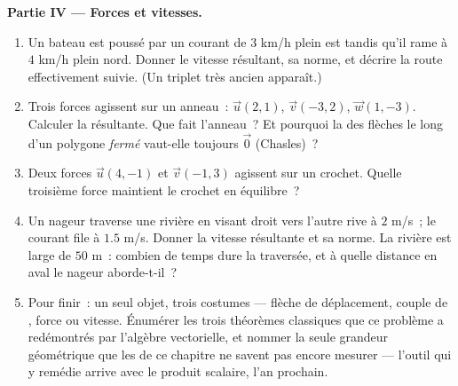 \begin{problem}
\medskip
\noindent\textbf{Partie IV --- Forces et vitesses.}
\begin{enumerate}[resume]
  \item Un bateau est poussé par un courant de $3$ km/h plein est
        tandis qu'il rame à $4$ km/h plein nord. Donner le 
        vitesse résultant, sa norme, et décrire la route
        effectivement suivie. (Un triplet très ancien apparaît.)
  \item Trois forces agissent sur un anneau~: $\vec u(2, 1)$,
        $\vec v(-3, 2)$, $\vec w(1, -3)$. Calculer la résultante.
        Que fait l'anneau~? Et pourquoi la  des flèches le long
        d'un polygone \emph{fermé} vaut-elle toujours $\vec 0$
        (Chasles)~?
  \item Deux forces $\vec u(4, -1)$ et $\vec v(-1, 3)$ agissent sur
        un crochet. Quelle troisième force maintient le crochet en
        équilibre~?
  \item Un nageur traverse une rivière en visant droit vers l'autre
        rive à $2$ m/s~; le courant file à $1.5$ m/s. Donner la
        vitesse résultante et sa norme. La rivière est large de
        $50$ m~: combien de temps dure la traversée, et à quelle
        distance en aval le nageur aborde-t-il~?
  \item Pour finir~: un seul objet, trois costumes --- flèche de
        déplacement, couple de , force ou vitesse.
        Énumérer les trois théorèmes classiques que ce problème a
        redémontrés par l'algèbre vectorielle, et nommer la seule
        grandeur géométrique que les  de ce chapitre ne
        savent pas encore mesurer --- l'outil qui y remédie arrive
        avec le produit scalaire, l'an prochain.
\end{enumerate}
\end{problem}
